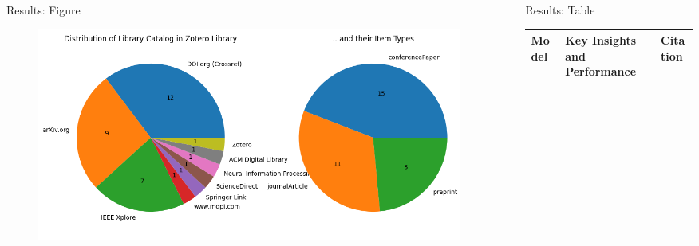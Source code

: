 \documentclass{beamer} %
\begin{document}
\begin{frame}[t]
\begin{columns}[t]
\begin{column}{0.3\textwidth}
			\begin{block}{Results: Figure}
				\begin{minipage}{\linewidth}
					\begin{figure}
						\includegraphics[width=\linewidth]{Figure_1.png}
					\end{figure}
				\end{minipage}
			\end{block}



		\end{column} %

		\begin{column}{0.02\textwidth}\end{column} %

		\begin{column}{0.3\textwidth}



			\begin{block}{Results: Table}
				\begin{footnotesize}
					\begin{tabular}{p{} p{} p{}}
						\toprule
						Model                         & Key Insights and Performance                                                                                   & Citation                                           \\
						\midrule


\end{tabular}
\end{footnotesize}
\end{block}
\end{column}
\end{columns}
\end{frame}
\end{document}
